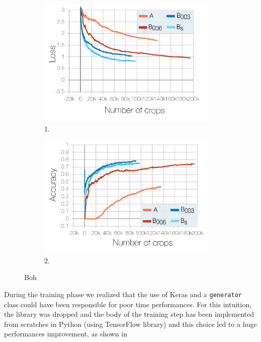 \documentclass[10pt,hidelinks]{article}
\begin{document}
\begin{figure}[ht]
	\begin{subfigure}{.5\textwidth}
		\centering
		\includegraphics[width=0.95\textwidth]{pics/loss_lr_005.pdf}
		\caption{1.}\label{fig:loss1}
	\end{subfigure}
	\begin{subfigure}{.5\textwidth}
		\centering
		\includegraphics[width=0.95\textwidth]{pics/acc_3_lr_005.pdf}
		\caption{2.}\label{fig:loss2}
	\end{subfigure}
	\caption{Boh}
	\label{fig:loss_pdf}
\end{figure}

During the training phase we realized that the use of Keras and a \texttt{generator} class  could have been responsible for poor time performances.
For this intuition, the library was dropped and the body of the training step has been implemented from scratches in Python (using TensorFlow library) and this choice led to a huge performances improvement, as shown in 
\end{document}
